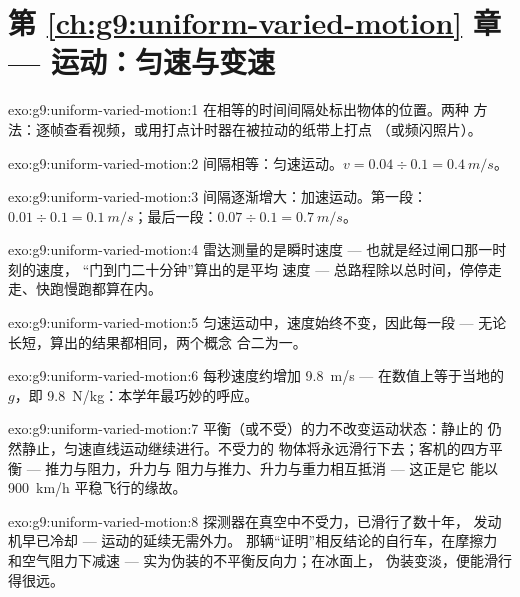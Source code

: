 \section*{第 \ref{ch:g9:uniform-varied-motion} 章 --- 运动：匀速与变速}

\begin{solution}{exo:g9:uniform-varied-motion:1}
在相等的时间间隔处标出物体的位置。两种
方法：逐帧查看视频，或用打点计时器在被拉动的纸带上打点
（或频闪照片）。
\end{solution}

\begin{solution}{exo:g9:uniform-varied-motion:2}
间隔相等：匀速运动。$v = 0.04 \div 0.1 = \qty{0.4}{m/s}$。
\end{solution}

\begin{solution}{exo:g9:uniform-varied-motion:3}
间隔逐渐增大：加速运动。第一段：$0.01 \div 0.1 =
\qty{0.1}{m/s}$；最后一段：$0.07 \div 0.1 = \qty{0.7}{m/s}$。
\end{solution}

\begin{solution}{exo:g9:uniform-varied-motion:4}
雷达测量的是瞬时速度 --- 也就是经过闸口那一时刻的速度，
“门到门二十分钟”算出的是平均
速度 --- 总路程除以总时间，停停走走、快跑慢跑都算在内。
\end{solution}

\begin{solution}{exo:g9:uniform-varied-motion:5}
匀速运动中，速度始终不变，因此每一段
--- 无论长短，算出的结果都相同，两个概念
合二为一。
\end{solution}

\begin{solution}{exo:g9:uniform-varied-motion:6}
每秒速度约增加 \qty{9.8}{m/s} --- 在数值上等于当地的
$g$，即 \qty{9.8}{N/kg}：本学年最巧妙的呼应。
\end{solution}

\begin{solution}{exo:g9:uniform-varied-motion:7}
平衡（或不受）的力不改变运动状态：静止的
仍然静止，匀速直线运动继续进行。不受力的
物体将永远滑行下去；客机的四方平衡 --- 推力与阻力，升力与
阻力与推力、升力与重力相互抵消 --- 这正是它
能以 \qty{900}{km/h} 平稳飞行的缘故。
\end{solution}

\begin{solution}{exo:g9:uniform-varied-motion:8}
探测器在真空中不受力，已滑行了数十年，
发动机早已冷却 --- 运动的延续无需外力。
那辆“证明”相反结论的自行车，在摩擦力
和空气阻力下减速 --- 实为伪装的不平衡反向力；在冰面上，
伪装变淡，便能滑行得很远。
\end{solution}

